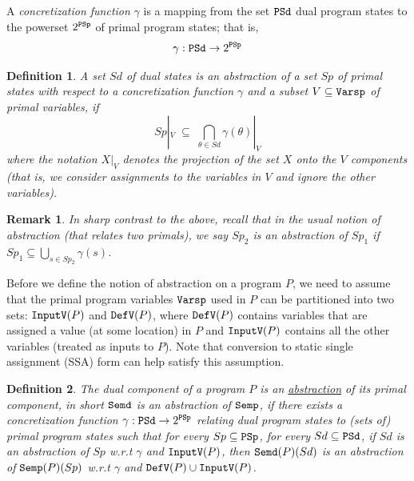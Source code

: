 \documentclass[preprint]{sig-alternate-05-2015}
\newtheorem{definition}{Definition}
\newtheorem{remark}{Remark}
\def\Vp{{\tt{Varsp}}}
\def\psp{{\tt{PSp}}}
\def\psd{{\tt{PSd}}}
\def\semp{{\tt{Semp}}}
\def\semd{{\tt{Semd}}}
\def\UndefV{{\tt{InputV}}}
\def\DefV{{\tt{DefV}}}
\begin{document}
A {\em{concretization function}} $\gamma$ is a mapping from 
the set $\psd$ dual program states to the powerset $2^\psp$ of
primal program states; that is,
$$ \gamma: \psd \rightarrow 2^{\psp} $$

\begin{definition}\label{def:abs0}
A set $Sd$ of dual states is an {\em{abstraction}} of 
a set $Sp$ of primal states with respect to a concretization
function $\gamma$ and a subset $V\subseteq\Vp$ of primal variables, 
if
$$
  Sp|_V \;\subseteq\; \bigcap_{\theta\in Sd}\gamma(\theta)|_V 
$$
where the notation $X|_V$ denotes the projection of the set $X$
onto the $V$ components (that is, we consider assignments to the
variables in $V$ and ignore the other variables).
\end{definition}

\begin{remark}
  In sharp contrast to the above,
  recall that in the usual notion of abstraction (that relates two primals),
  we say $Sp_2$ is an abstraction of $Sp_1$ if 
  $Sp_1 \subseteq \bigcup_{s\in Sp_2}\gamma(s)$.
\end{remark}

Before we define the notion of abstraction on a program $P$,
we need to assume that 
the primal program variables $\Vp$ used in $P$
can be partitioned into two sets: $\UndefV(P)$ and $\DefV(P)$,
where $\DefV(P)$ contains variables that are
assigned a value (at some location) in $P$ 
and $\UndefV(P)$ contains all the other
variables (treated as inputs to $P$).
Note that conversion to
static single assignment (SSA) form can help
satisfy this assumption.

\begin{definition}\label{def:abs}
The dual component of a program $P$
is an {\underline{abstraction}} of its primal component,
in short {{$\semd$ is an abstraction of $\semp$}},
if there exists a {\em{concretization}} function
$
 \gamma: \psd \rightarrow 2^{\psp}
$
relating dual program states to (sets of) primal program states such
that
for every $Sp\subseteq \psp$, 
for every $Sd\subseteq \psd$,
if $Sd$ is an abstraction of $Sp$ w.r.t $\gamma$ and $\UndefV(P)$,
then
$\semd(P)(Sd)$ is an abstraction of $\semp(P)(Sp)$ w.r.t $\gamma$ and
$\DefV(P)\cup\UndefV(P)$.
\end{definition}
\end{document}
